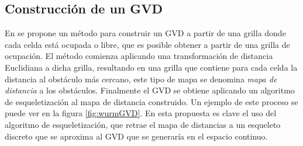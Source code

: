 \subsection{Construcción de un GVD}\label{subsec:constGVD}


En \cite{wurm2008coordinated} se propone un método para construir un GVD a partir de una grilla donde cada celda está ocupada o libre, que es posible obtener a partir de una grilla de ocupación. El método comienza aplicando una transformación de distancia Euclidiana \cite{meijster2002general} a dicha grilla, resultando en una grilla que contiene para cada celda la distancia al obstáculo más cercano, este tipo de mapa se denomina \emph{mapa de distancia} a los obstáculos. Finalmente el GVD se obtiene aplicando un algoritmo de esqueletización \cite{zhang1984fast} al mapa de distancia construido. Un ejemplo de este proceso se puede ver en la figura \ref{fig:wurmGVD}. En esta propuesta es clave el uso del algoritmo de esqueletización, que retrae el mapa de distancias a un esqueleto discreto que se aproxima al GVD que se generaría en el espacio continuo.   

